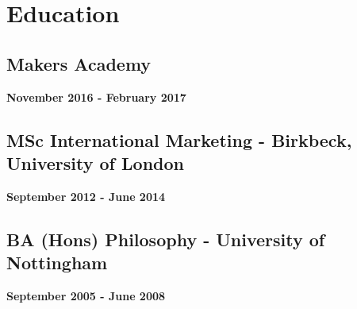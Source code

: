 \documentclass[a4paper]{scrartcl}
\begin{document}
\section*{Education}

\subsection*{Makers Academy}
\textbf{November 2016 - February 2017}

\subsection*{MSc International Marketing - Birkbeck, University of London}
\textbf{September 2012 - June 2014}

\subsection*{BA (Hons) Philosophy - University of Nottingham}
\textbf{September 2005 - June 2008}
\end{document}
